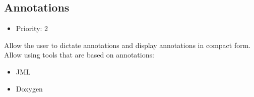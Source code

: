\subsection{Annotations}
\begin{itemize}
	\item Priority: 2
\end{itemize}
Allow the user to dictate annotations and display annotations in compact form.
Allow using tools that are based on annotations:
\begin{itemize}
	\item JML
	\item Doxygen
\end{itemize}